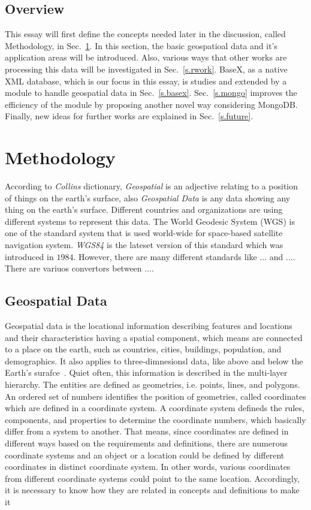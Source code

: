 \documentclass[a4paper,12pt]{article}
\begin{document}
\subsection{Overview}
This essay will first define the concepts needed later in the discussion, called
Methodology, in Sec.~\ref{s.method}. In this section, the basic geospatioal data
and it's application areas will be introduced. Also, various ways that other works
are processing this data will be investigated in Sec.~\ref{s.rwork}. BaseX,
as a native XML database, which is our focus in this essay, is studies and extended
by a module to handle geospatial data in Sec.~\ref{s.basex}. 
Sec.~\ref{s.mongo} improves the efficiency of the module
by proposing another novel way considering MongoDB.
Finally, new ideas for further works are explained in
Sec.~\ref{s.future}.


\newpage
\section{Methodology}
\label{s.method}
According to \emph{Collins} dictionary, \emph{Geospatial} is an adjective relating to a position of things on the
earth's surface, also \emph{Geospatial Data}  is any data showing any thing on the earth's surface. Different 
countries and organizations are using different systems to represent this data. 
The World Geodesic System (WGS) is one of the standard system that is used world-wide 
for space-based satellite navigation system. \emph{WGS84} is the lateset version of this standard which
was introduced in $1984$. However, there are many different standards like ... and .... 
There are variuos convertors between ....

\subsection{Geospatial Data}
Geospatial data is the locational information describing features and locations and their characteristics having a spatial component, which means are connected to a place on the earth, such as countries, cities, buildings, population, and demographics. It also applies to three-dimnesionsl data, like above and below the Earth's surafce~\cite{powell}. Quiet often, this information is described in the multi-layer hierarchy. The entities are defined as geometries, i.e. points, lines, and polygons. An ordered set of numbers identifies the position of geometries, called coordinates which are defined in a coordinate system. A coordinate system defineds the rules, components, and properties to determine the coordinate numbers, which basically differ from a system to another. That means, since coordinates are defined in different ways based on the requirements and definitions, there are numerous coordinate systems and an object or a location could be defined by different coordinates in distinct coordinate system. In other words, various coordinates from different coordinate systems could point to the same location. Accordingly, it is necessary to know how they are related in concepts and definitions to make it 
\end{document}
